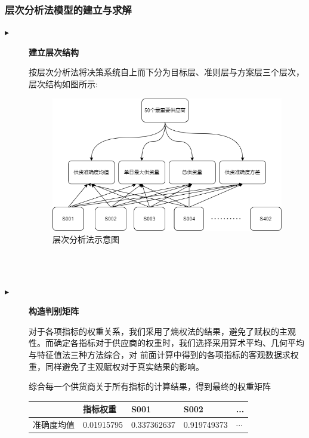 \documentclass{cumcmthesis}
\begin{document}
\subsubsection*{层次分析法模型的建立与求解}
\begin{description}
    \item[$\blacktriangleright$] \textbf{建立层次结构}\par
        按层次分析法将决策系统自上而下分为目标层、准则层与方案层三个层次，层次结构如图所示:
        \begin{figure}[htbp]
            \centering
            \includegraphics[scale=0.6]{AHP.png}
            \caption{层次分析法示意图}     \label{fig:3}
        \end{figure}
        \\
        \\
    \item[$\blacktriangleright$] \textbf{构造判别矩阵}\par
        对于各项指标的权重关系，我们采用了熵权法的结果，避免了赋权的主观性。而确定各指标对于供应商的权重时，我们选择采用算术平均、几何平均与特征值法三种方法综合，对
        前面计算中得到的各项指标的客观数据求权重，同样避免了主观赋权对于真实结果的影响。\par
        综合每一个供货商关于所有指标的计算结果，得到最终的权重矩阵\par
        \begin{table}[htbp]
            \begin{tabular}{|l|l|l|l|l|}
                \hline
                                         & 指标权重    & S001        & S002        & ...      \\
                \hline
                准确度均值               & 0.01915795  & 0.337362637 & 0.919749373 & $\cdots$ \\

\end{tabular}
\end{table}
\end{description}
\end{document}
